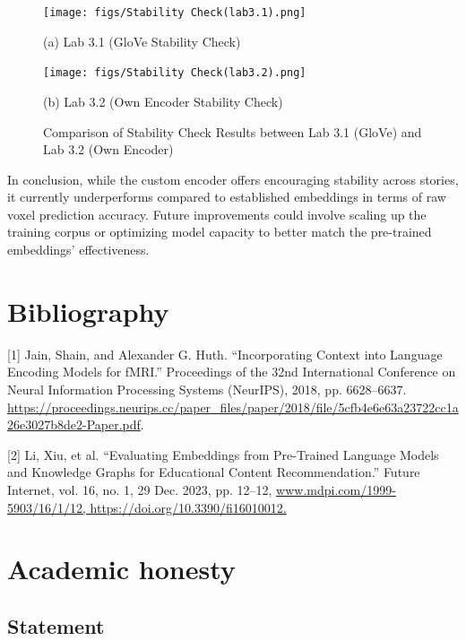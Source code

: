 \documentclass[11pt,letterpaper]{article}
\begin{document}
\begin{figure}[H]
\centering
\begin{minipage}{0.48\textwidth}
    \centering
    \texttt{[image: figs/Stability Check(lab3.1).png]}
    \caption*{(a) Lab 3.1 (GloVe Stability Check)}
\end{minipage}
\hfill
\begin{minipage}{0.48\textwidth}
    \centering
    \texttt{[image: figs/Stability Check(lab3.2).png]}
    \caption*{(b) Lab 3.2 (Own Encoder Stability Check)}
\end{minipage}
\caption{Comparison of Stability Check Results between Lab 3.1 (GloVe) and Lab 3.2 (Own Encoder)}
\label{fig:stability_comparison}
\end{figure}

In conclusion, while the custom encoder offers encouraging stability across stories, it currently underperforms compared to established embeddings in terms of raw voxel prediction accuracy. Future improvements could involve scaling up the training corpus or optimizing model capacity to better match the pre-trained embeddings' effectiveness.

\newpage
\sloppy
\section{Bibliography}

[1] Jain, Shain, and Alexander G. Huth. “Incorporating Context into Language Encoding Models for fMRI.” Proceedings of the 32nd International Conference on Neural Information Processing Systems (NeurIPS), 2018, pp. 6628–6637. \url{https://proceedings.neurips.cc/paper_files/paper/2018/file/5cfb4e6e63a23722cc1a26e3027b8de2-Paper.pdf}.

[2] Li, Xiu, et al. “Evaluating Embeddings from Pre-Trained Language Models and Knowledge Graphs for Educational Content Recommendation.” Future Internet, vol. 16, no. 1, 29 Dec. 2023, pp. 12–12, \url{www.mdpi.com/1999-5903/16/1/12, https://doi.org/10.3390/fi16010012.}

\appendix

\vspace{1em} %
\section{Academic honesty}

\vspace{1em} %
\subsection{Statement}
\vspace{0.5em} %
\end{document}
